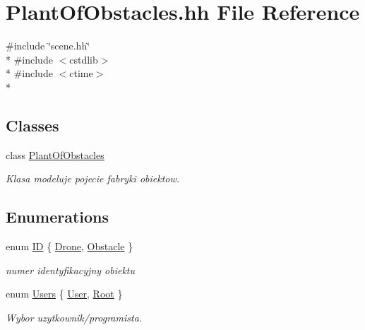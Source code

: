 \hypertarget{_plant_of_obstacles_8hh}{}\section{Plant\+Of\+Obstacles.\+hh File Reference}
\label{_plant_of_obstacles_8hh}
{\ttfamily \#include \char`\"{}scene.\+hh\char`\"{}}\\*
{\ttfamily \#include $<$cstdlib$>$}\\*
{\ttfamily \#include $<$ctime$>$}\\*
\subsection*{Classes}
\begin{DoxyCompactItemize}
\item 
class \hyperlink{class_plant_of_obstacles}{Plant\+Of\+Obstacles}
\begin{DoxyCompactList}\small\item\em Klasa modeluje pojecie fabryki obiektow. \end{DoxyCompactList}\end{DoxyCompactItemize}
\subsection*{Enumerations}
\begin{DoxyCompactItemize}
\item 
enum \hyperlink{_plant_of_obstacles_8hh_a094c367727273b4da2b960ca3b3edc06}{ID} \{ \hyperlink{_plant_of_obstacles_8hh_a094c367727273b4da2b960ca3b3edc06a62256e12fe206e6212239877e25c1c66}{Drone}, 
\hyperlink{_plant_of_obstacles_8hh_a094c367727273b4da2b960ca3b3edc06a297b29d409921385e20239f12db235ed}{Obstacle}
 \}\begin{DoxyCompactList}\small\item\em numer identyfikacyjny obiektu \end{DoxyCompactList}
\item 
enum \hyperlink{_plant_of_obstacles_8hh_a4c502dc6ce14797e2bb86775ccf09cbf}{Users} \{ \hyperlink{_plant_of_obstacles_8hh_a4c502dc6ce14797e2bb86775ccf09cbfae168fb880dc0042ac28438e1875e41d3}{User}, 
\hyperlink{_plant_of_obstacles_8hh_a4c502dc6ce14797e2bb86775ccf09cbfac886d5190f68bd172807c62df7a1b536}{Root}
 \}\begin{DoxyCompactList}\small\item\em Wybor uzytkownik/programista. \end{DoxyCompactList}
\end{DoxyCompactItemize}



